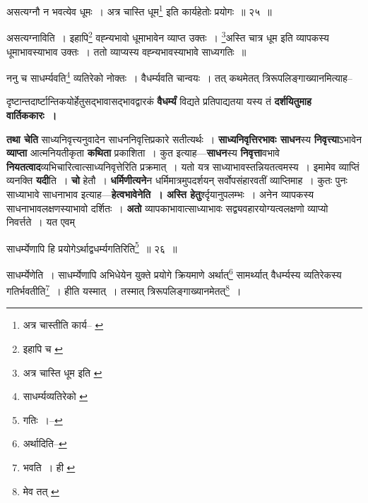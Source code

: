 \documentclass[article,12pt,a4paper]{memoir}
\begin{document}
	  \bigskip
	  \begingroup
	

	  \pstart असत्यग्नौ न भवत्येव धूमः । अत्र चास्ति धूम\footnote{अत्र चास्तीति कार्य--\cite{dp-msC} \cite{dp-msD}} इति कार्यहेतोः प्रयोगः ॥ २५ ॥
	\pend
      
	  \endgroup
	 

	  \pstart असत्यग्नाविति । इहापि\footnote{इहापि च \cite{dp-msC} \cite{dp-msD}} वह्न्यभावो धूमाभावेन व्याप्त उक्तः । \footnote{अत्र चास्ति धूम इति \cite{dp-msC} \cite{dp-msD}}\-अस्ति चात्र धूम इति व्यापकस्य धूमाभावस्याभाव उक्तः । ततो व्याप्यस्य वह्न्यभावस्याभावे साध्यगतिः ॥
	\pend
       

	  \pstart ननु च साधर्म्यवति\footnote{साधर्म्यव्यतिरेको \cite{dp-msB}} व्यतिरेको नोक्तः । वैधर्म्यवति चान्वयः । तत् कथमेतत् त्रिरूपलिङ्गाख्यानमित्याह--
	\pend
      
	  \endgroup
	

	  \pstart दृष्टान्तदार्ष्टान्तिकयोर्हेतुसद्भावासद्भावद्वारकं \textbf{वैधर्म्यं} विद्यते प्रतिपाद्यतया यस्य तं \textbf{दर्शयितुमाह वार्तिककारः ।}
	\pend
      

	  \pstart \textbf{तथा चेति} साध्यनिवृत्त्यनुवादेन साधननिवृत्तिप्रकारे सतीत्यर्थः । \textbf{साध्यनिवृत्तिरभावः साधन}स्य \textbf{निवृत्त्या}ऽभावेन \textbf{व्याप्ता} आत्मनियतीकृता \textbf{कथिता} प्रकाशिता । कुत इत्याह—\textbf{साधन}स्य \textbf{निवृत्ता}वभावे \textbf{नियतत्वाद}व्यभिचारित्वात्साध्यनिवृत्तेरिति प्रक्रमात् । यतो यत्र साध्याभावस्तन्नियतत्वमस्य । इमामेव व्याप्तिं व्यनक्ति \textbf{यदी}ति । \textbf{चो} हेतौ । \textbf{धर्मिणीत्यने}न धर्मिमात्रमुपदर्शयन् सर्वोपसंहारवतीं व्याप्तिमाह । कुतः पुनः साध्याभावे साधनाभाव इत्याह—\textbf{हेत्वभावेनेति । अस्ति हेतु}र्श्दृयानुपलम्भः । अनेन व्यापकस्य साधनाभावलक्षणस्याभावो दर्शितः । \textbf{अतो} व्यापकाभावात्साध्याभावः सद्व्यवहारयोग्यत्वलक्षणो व्याप्यो निवर्त्तते । यत एवम्
	\pend
	  \bigskip
	  \begingroup
	
	  \bigskip
	  \begingroup
	

	  \pstart साधर्म्येणापि हि प्रयोगेऽर्थाद्वधर्म्यगतिरिति\footnote{गतिः ।--\cite{dp-msC}} ॥ २६ ॥
	\pend
      
	  \endgroup
	 

	  \pstart साधर्म्येणेति । साधर्म्येणापि अभिधेयेन युक्ते प्रयोगे क्रियमाणे अर्थात्\footnote{अर्थादिति--\cite{dp-msC}} सामर्थ्यात् वैधर्म्यस्य व्यतिरेकस्य गतिर्भवतीति\footnote{भवति । ही \cite{dp-msB} \cite{dp-msC} \cite{dp-msD}} । हीति यस्मात् । तस्मात् त्रिरूपलिङ्गाख्यानमेतत्\footnote{मेव तत् \cite{dp-msC}} ।
	\pend
       
\end{document}
